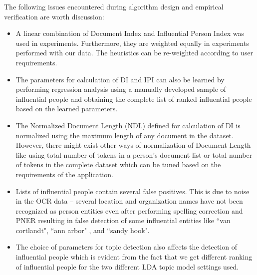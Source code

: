 The following issues encountered during algorithm design and empirical verification are worth discussion:
\begin{itemize}


\item  A linear combination of Document Index and Influential Person Index was used in experiments. Furthermore, they are weighted equally in experiments performed with our data. The heuristics can be re-weighted according to user requirements. 

\item
The parameters for calculation of DI and IPI can also be learned by performing regression analysis using a manually developed sample of influential people and obtaining the complete list of ranked influential people based on the learned parameters.

\item
The Normalized Document Length (NDL) defined for calculation of DI is normalized using the maximum length of any document in the dataset. However, there might exist other ways of normalization of Document Length like using total number of tokens in a person's document list or total number of tokens in the complete dataset which can be tuned based on the requirements of the application.

\item
Lists of influential people contain several false positives. This is due to noise in the OCR data -- several location and organization names have not been recognized as person entities even after performing spelling correction and PNER resulting in false detection of some influential entities like ``van cortlandt", ``ann arbor" ,  and ``sandy hook".  

\item The choice of parameters for topic detection also affects the detection of influential people which is evident from the fact that we get different ranking of influential people for the two different LDA topic model settings used. 






\end{itemize}
